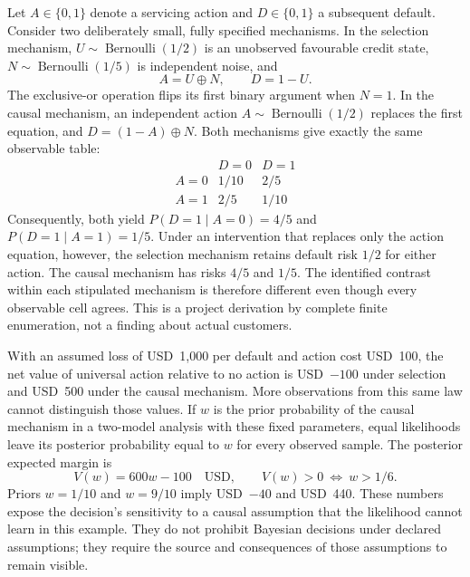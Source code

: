 Let $A\in\{0,1\}$ denote a servicing action and $D\in\{0,1\}$ a subsequent
default. Consider two deliberately small, fully specified mechanisms. In the
selection mechanism, $U\sim\operatorname{Bernoulli}(1/2)$ is an unobserved
favourable credit state, $N\sim\operatorname{Bernoulli}(1/5)$ is independent noise,
and
\begin{equation}
 A=U\mathbin{\oplus}N,\qquad D=1-U.
 \label{exec22:state-selection}
\end{equation}
The exclusive-or operation flips its first binary argument when $N=1$. In the
causal mechanism, an independent action $A\sim\operatorname{Bernoulli}(1/2)$
replaces the first equation, and $D=(1-A)\mathbin{\oplus}N$. Both mechanisms give
exactly the same observable table:
\begin{equation}
\begin{array}{c|cc}
 &D=0&D=1\\ \hline
A=0&1/10&2/5\\
A=1&2/5&1/10
\end{array}
\label{exec22:state-table}
\end{equation}
Consequently, both yield $P(D=1\mid A=0)=4/5$ and
$P(D=1\mid A=1)=1/5$. Under an intervention that replaces only the action
equation, however, the selection mechanism retains default risk $1/2$ for
either action. The causal mechanism has risks $4/5$ and $1/5$. The identified
contrast within each stipulated mechanism is therefore different even though
every observable cell agrees. This is a project derivation by complete finite
enumeration, not a finding about actual customers.~\citep{exec22_state_reference}

With an assumed loss of USD~1,000 per default and action cost USD~100, the net
value of universal action relative to no action is USD~$-100$ under selection
and USD~500 under the causal mechanism. More observations from this same law
cannot distinguish those values. If $w$ is the prior probability of the causal
mechanism in a two-model analysis with these fixed parameters, equal likelihoods
leave its posterior probability equal to $w$ for every observed sample. The
posterior expected margin is
\begin{equation}
 V(w)=600w-100\quad\text{USD},\qquad V(w)>0\ \Longleftrightarrow\ w>1/6.
 \label{exec22:state-prior}
\end{equation}
Priors $w=1/10$ and $w=9/10$ imply USD~$-40$ and USD~440. These numbers expose
the decision's sensitivity to a causal assumption that the likelihood cannot
learn in this example. They do not prohibit Bayesian decisions under declared
assumptions; they require the source and consequences of those assumptions to
remain visible.

